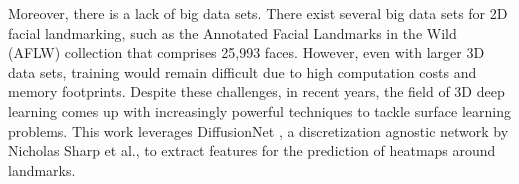 Moreover, there is a lack of big data sets. There exist several big data sets for 2D facial landmarking, such as the Annotated Facial Landmarks in the Wild (AFLW) \cite{aflw} collection that comprises 25,993 faces. However, even with larger 3D data sets, training would remain difficult due to high computation costs and memory footprints.%
Despite these challenges, in recent years, the field of 3D deep learning comes up with increasingly powerful techniques to tackle surface learning problems. This work leverages DiffusionNet \cite{sharp2022diffusion}, a discretization agnostic network by Nicholas Sharp et al., to extract features for the prediction of heatmaps around landmarks.








